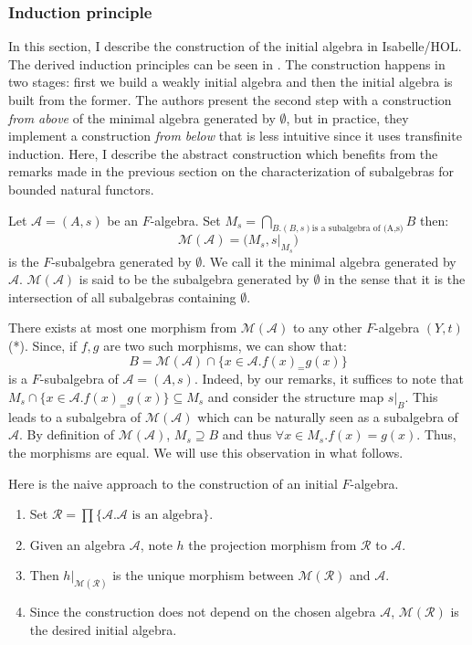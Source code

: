 \documentclass[notitlepage]{article}
\begin{document}
\subsubsection{Induction principle}

In this section, I describe the construction of the initial algebra in Isabelle/HOL. The derived induction principles can be seen in \cite{traytel}. The construction happens in two stages: first we build a weakly initial algebra and then the initial algebra is built from the former. The authors present the second step with a construction \textit{from above} of the minimal algebra generated by $\emptyset$, but in practice, they implement a construction \textit{from below} that is less intuitive since it uses transfinite induction. Here, I describe the abstract construction which benefits from the remarks made in the previous section on the characterization of subalgebras for bounded natural functors.

Let $\mathcal{A}=(A,s)$ be an $F$-algebra. Set $M_s = \bigcap_{B. (B,s) \text{is a subalgebra of (A,s)}} B$ then: \[\mathcal{M}(\mathcal{A}) = \Big(M_s,s \Big|_{M_s} \Big)\] is the $F$-subalgebra generated by $\emptyset$. We call it the minimal algebra generated by $\mathcal{A}$. $\mathcal{M}(\mathcal{A})$ is said to be the subalgebra generated by $\emptyset$ in the sense that it is the intersection of all subalgebras containing $\emptyset$.

There exists at most one morphism from $\mathcal{M}(\mathcal{A})$ to any other $F$-algebra $(Y,t)$ (*). Since, if $f,g$ are two such morphisms, we can show that: $$B = \mathcal{M}(\mathcal{A}) \cap \{x \in \mathcal{A}. f(x) _= g(x)\}$$ is a $F$-subalgebra of $\mathcal{A}=(A,s)$. Indeed, by our remarks, it suffices to note that $M_s \cap \{x \in \mathcal{A}. f(x) _= g(x)\} \subseteq M_s$ and consider the structure map $s|_B$. This leads to a subalgebra of $\mathcal{M}(\mathcal{A})$ which can be naturally seen as a subalgebra of $\mathcal{A}$. By definition of $\mathcal{M}(\mathcal{A})$, $M_s \supseteq B$ and thus $\forall x \in M_s. f(x) = g(x)$. Thus, the morphisms are equal. We will use this observation in what follows.

Here is the naive approach to the construction of an initial $F$-algebra.

\begin{enumerate}
	\item Set $\mathcal{R} = \prod \{\mathcal{A}. \mathcal{A} \text{ is an algebra}\}$.
	\item Given an algebra $\mathcal{A}$, note $h$ the projection morphism from $\mathcal{R}$ to $\mathcal{A}$.
	\item Then $h|_{\mathcal{M}(\mathcal{R})}$ is the unique morphism between $\mathcal{M}(\mathcal{R})$ and $\mathcal{A}$.
	\item Since the construction does not depend on the chosen algebra $\mathcal{A}$,  $\mathcal{M}(\mathcal{R})$ is the desired initial algebra.
\end{enumerate}
\end{document}
